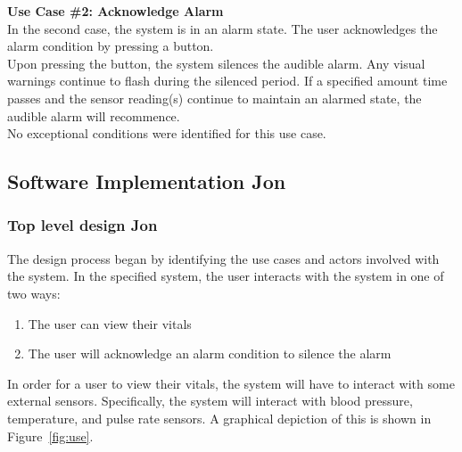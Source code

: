 \documentclass[12pt]{article} %
\begin{document}
\textbf{Use Case \#2: Acknowledge Alarm} \\
In the second case, the system is in an alarm state. The user acknowledges
the alarm condition by pressing a button. \\
Upon pressing the button, the system silences the audible alarm. Any visual warnings continue to flash during the silenced period. If a specified amount 
time passes and the sensor reading(s) continue to maintain an alarmed state,
the audible alarm will recommence.\\ 

No exceptional conditions were identified for this use case.\\


\subsection{Software Implementation  Jon}


\subsubsection{Top level design Jon}


The design process began by identifying the use cases and actors involved with the system.  In the specified system, the user interacts with the system in one of two ways:
\begin{enumerate}
  \item The user can view their vitals
  \item The user will acknowledge an alarm condition to silence the alarm
\end{enumerate}
In order for a user to view their vitals, the system will have to interact with some external sensors.  Specifically, the system will interact with blood pressure, temperature, and pulse rate sensors.  A graphical depiction of this is shown in Figure~\ref{fig:use}.
\end{document}
